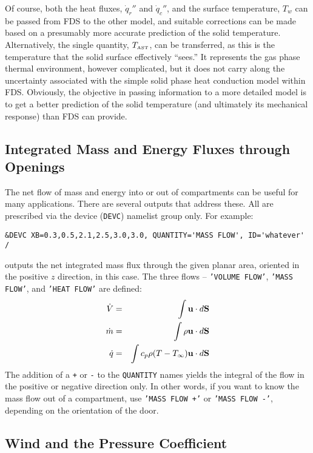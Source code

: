 \documentclass[11pt]{book}
\newcommand{\ct}{\tt\small}
\newcommand{\dS}{{d\bf S}}
\newcommand{\bu}{{\bf u}}
\begin{document}
Of course, both the heat fluxes, $\dot{q}_r''$ and $\dot{q}_c''$, and the surface temperature, $T_w$ can be passed from FDS to the
other model, and suitable corrections can be made based on a presumably more accurate prediction of the solid temperature.
Alternatively, the single quantity, $T_{\hbox{\tiny AST}}$, can be transferred, as this is the temperature that the solid
surface effectively ``sees.'' It represents the gas phase thermal environment, however complicated, but it does not
carry along the uncertainty associated with the simple solid phase heat conduction model within FDS. Obviously, the
objective in passing information to a more detailed model is to get a better prediction of the solid temperature (and
ultimately its mechanical response) than FDS can provide.



\subsection{Integrated Mass and Energy Fluxes through Openings}
\label{info:flows}

The net flow of mass and energy into or out of compartments can be useful for many applications. There are several outputs that address these. All are prescribed via
the device ({\ct DEVC}) namelist group only. For example:

\footnotesize
\begin{verbatim}
&DEVC XB=0.3,0.5,2.1,2.5,3.0,3.0, QUANTITY='MASS FLOW', ID='whatever' /
\end{verbatim}
\normalsize

\noindent
outputs the net integrated mass flux through the given planar area, oriented in the positive $z$ direction, in this case. The three flows -- {\ct 'VOLUME FLOW'}, {\ct 'MASS FLOW'},
and {\ct 'HEAT FLOW'} are defined:
\begin{eqnarray*} \dot{V} &=& \int \bu \cdot \dS  \\
                  \dot{m} &=& \int \rho \bu \cdot \dS \\
                  \dot{q} &=& \int c_p \rho (T-T_\infty) \bu \cdot \dS  \end{eqnarray*}
The addition of a {\ct +} or {\ct -} to the {\ct QUANTITY} names yields the integral of the flow in the positive or negative direction only. In other words, if you want to know
the mass flow out of a compartment, use {\ct 'MASS FLOW +'} or {\ct 'MASS FLOW -'}, depending on the orientation of the door.


\subsection{Wind and the Pressure Coefficient}
\label{info:wind}
\end{document}
